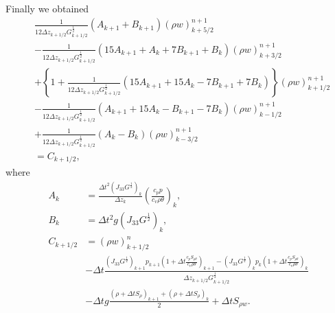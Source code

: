Finally we obtained
\begin{align}
  & \frac{1}{12\Delta z_{k+1/2} G^{\frac{1}{2}}_{k+1/2}}(A_{k+1} + B_{k+1}) (\rho w)_{k+5/2}^{n+1} \\
  &- \frac{1}{12\Delta z_{k+1/2} G^{\frac{1}{2}}_{k+1/2}}(15A_{k+1} + A_k + 7B_{k+1} + B_k) (\rho w)_{k+3/2}^{n+1} \\
  &+ \left\{ 1 + \frac{1}{12\Delta z_{k+1/2} G^{\frac{1}{2}}_{k+1/2}}(15A_{k+1} + 15A_k - 7B_{k+1} + 7B_k)  \right\}(\rho w)_{k+1/2}^{n+1} \\
  &- \frac{1}{12\Delta z_{k+1/2} G^{\frac{1}{2}}_{k+1/2}}(A_{k+1} + 15A_k - B_{k+1} - 7B_k) (\rho w)_{k-1/2}^{n+1} \\
  &+ \frac{1}{12\Delta z_{k+1/2} G^{\frac{1}{2}}_{k+1/2}}(A_k - B_k) (\rho w)_{k-3/2}^{n+1} \\
  &= C_{k+1/2},
\end{align}
where
\begin{align}
  A_k &= \frac{\Delta t^2 (J_{33}G^{\frac{1}{2}})_k}{\Delta z_k}\left(\frac{c_pp}{c_v\rho\theta}\right)_k, \\
  B_k &= \Delta t^2 g (J_{33}G^{\frac{1}{2}})_k, \\
  C_{k+1/2} &=
  (\rho w)_{k+1/2}^n \nonumber \\&
  -\Delta t\frac{
  (J_{33}G^{\frac{1}{2}})_{k+1} p_{k+1}\left(1+\Delta t\frac{c_pS_{\rho\theta}}{c_v\rho\theta}\right)_{k+1}
  - (J_{33}G^{\frac{1}{2}})_k p_k\left(1+\Delta t\frac{c_pS_{\rho\theta}}{c_v\rho\theta}\right)_k}{\Delta z_{k+1/2} G^{\frac{1}{2}}_{k+1/2}} \nonumber\\ &
  -\Delta t g \frac{(\rho+\Delta t S_\rho)_{k+1}+(\rho+\Delta t S_\rho)_k}{2} + \Delta t S_{\rho w}.
\end{align}

